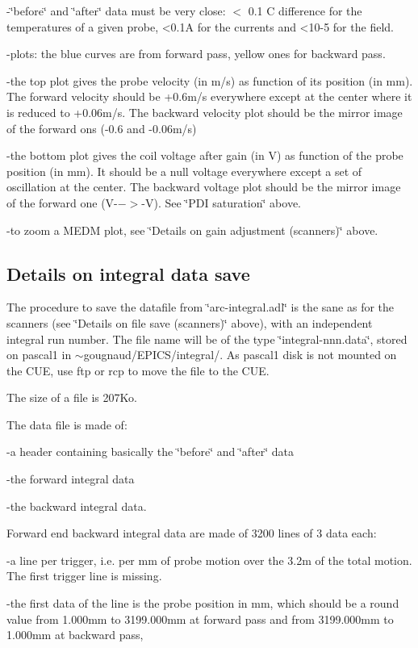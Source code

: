 -\char`\"{}before\char`\"{} and \char`\"{}after\char`\"{} data must be very
close: $<$ 0.1 C difference for the temperatures of a given probe, <0.1A for the
currents and <10-5 for the field. 

-plots: the blue curves are from forward pass, yellow ones for backward pass. 

-the top plot gives the probe velocity (in m/s) as function of its position
(in mm). The forward velocity should be +0.6m/s everywhere except at the center
where it is reduced to +0.06m/s. The backward velocity plot should be the mirror
image of the forward ons (-0.6 and -0.06m/s) 

-the bottom plot gives the coil voltage after gain (in V) as function of the
probe position (in mm). It should be a null voltage everywhere except a set
of oscillation at the center. The backward voltage plot should be the mirror
image of the forward one (V-$->$-V). See \char`\"{}PDI saturation\char`\"{} above. 

-to zoom a MEDM plot, see \char`\"{}Details on gain adjustment (scanners)\char`\"{}
above. 


\subsection{Details on integral data save }

The procedure to save the datafile from \char`\"{}arc-integral.adl\char`\"{}
is the sane as for the scanners (see \char`\"{}Details on file save (scanners)\char`\"{}
above), with an independent integral run number. The file name will be of the
type \char`\"{}integral-nnn.data\char`\"{}, stored on pascal1 in \( \sim  \)gougnaud/EPICS/integral/.
As pascal1 disk is not mounted on the CUE, use ftp or rcp to move the file to
the CUE. 

The size of a file is 207Ko. 

The data file is made of: 

-a header containing basically the \char`\"{}before\char`\"{} and \char`\"{}after\char`\"{}
data 

-the forward integral data 

-the backward integral data. 

Forward end backward integral data are made of 3200 lines of 3 data each: 

-a line per trigger, i.e. per mm of probe motion over the 3.2m of the total
motion. The first trigger line is missing. 

-the first data of the line is the probe position in mm, which should be a round
value from 1.000mm to 3199.000mm at forward pass and from 3199.000mm to 1.000mm
at backward pass, 

